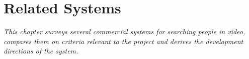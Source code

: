 \chapter{Related Systems}
\label{chapter:lienquan}

\textit{This chapter surveys several commercial systems for searching people in video, compares them on criteria relevant to the project and derives the development directions of the system.}




